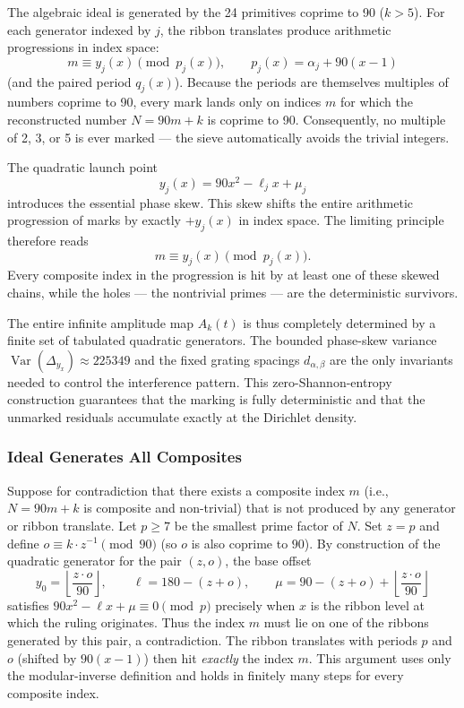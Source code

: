 \documentclass[11pt,a4paper]{article}
\begin{document}
The algebraic ideal is generated by the 24 primitives coprime to 90 (\(k>5\)). For each generator indexed by \(j\), the ribbon translates produce arithmetic progressions in index space:
\[
m \equiv y_j(x) \pmod{p_j(x)}, \qquad p_j(x)=\alpha_j + 90(x-1)
\]
(and the paired period \(q_j(x)\)). Because the periods are themselves multiples of numbers coprime to 90, every mark lands only on indices \(m\) for which the reconstructed number \(N=90m+k\) is coprime to 90. Consequently, no multiple of 2, 3, or 5 is ever marked — the sieve automatically avoids the trivial integers.

The quadratic launch point
\[
y_j(x) = 90x^2 - \ell_j x + \mu_j
\]
introduces the essential phase skew. This skew shifts the entire arithmetic progression of marks by exactly \(+y_j(x)\) in index space. The limiting principle therefore reads
\[
m \equiv y_j(x) \pmod{p_j(x)}.
\]
Every composite index in the progression is hit by at least one of these skewed chains, while the holes — the nontrivial primes — are the deterministic survivors.

The entire infinite amplitude map \(A_k(t)\) is thus completely determined by a finite set of tabulated quadratic generators. The bounded phase-skew variance \(\operatorname{Var}(\Delta_{y_x})\approx225349\) and the fixed grating spacings \(d_{\alpha,\beta}\) are the only invariants needed to control the interference pattern. This zero-Shannon-entropy construction guarantees that the marking is fully deterministic and that the unmarked residuals accumulate exactly at the Dirichlet density.

\subsubsection{Ideal Generates All Composites}
Suppose for contradiction that there exists a composite index $m$ (i.e., $N=90m+k$ is composite and non-trivial) that is not produced by any generator or ribbon translate. Let $p\geq7$ be the smallest prime factor of $N$. Set $z=p$ and define $o\equiv k\cdot z^{-1}\pmod{90}$ (so $o$ is also coprime to $90$). By construction of the quadratic generator for the pair $(z,o)$, the base offset
\[
y_0=\left\lfloor\frac{z\cdot o}{90}\right\rfloor, \qquad \ell=180-(z+o), \qquad \mu=90-(z+o)+\left\lfloor\frac{z\cdot o}{90}\right\rfloor
\]
satisfies $90x^2-\ell x+\mu\equiv0\pmod{p}$ precisely when $x$ is the ribbon level at which the ruling originates. Thus the index $m$ must lie on one of the ribbons generated by this pair, a contradiction. The ribbon translates with periods $p$ and $o$ (shifted by $90(x-1)$) then hit \emph{exactly} the index $m$. This argument uses only the modular-inverse definition and holds in finitely many steps for every composite index. 
\end{document}
